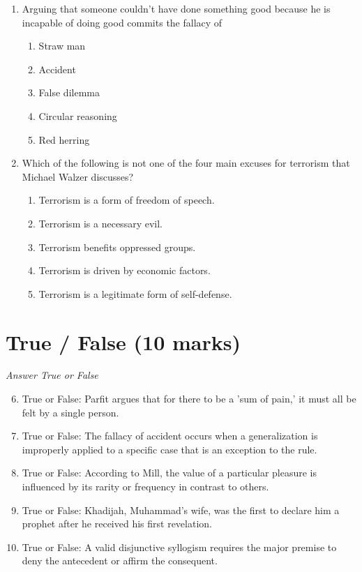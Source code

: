 \documentclass[12pt]{article}
\begin{document}
\begin{enumerate}[label=\arabic*.]
\begin{enumerate}[label=(\alph*)]
\end{enumerate}
\item Arguing that someone couldn't have done something good because he is incapable of doing
good commits the fallacy of
\begin{enumerate}[label=(\alph*)]
    \item Straw man
    \item Accident
    \item False dilemma
    \item Circular reasoning
    \item Red herring
\end{enumerate}
\item Which of the following is not one of the four main excuses for terrorism that Michael
Walzer discusses?
\begin{enumerate}[label=(\alph*)]
    \item Terrorism is a form of freedom of speech.
    \item Terrorism is a necessary evil.
    \item Terrorism benefits oppressed groups.
    \item Terrorism is driven by economic factors.
    \item Terrorism is a legitimate form of self-defense.
\end{enumerate}
\end{enumerate}

\section*{True / False (10 marks)}
\textit{Answer True or False}
\begin{enumerate}[label=\arabic*.]
\setcounter{enumi}{5}
\item True or False: Parfit argues that for there to be a 'sum of pain,' it must all be felt by a single person.
\item True or False: The fallacy of accident occurs when a generalization is improperly applied to a specific case that is an exception to the rule.
\item True or False: According to Mill, the value of a particular pleasure is influenced by its rarity or frequency in contrast to others.
\item True or False: Khadijah, Muhammad's wife, was the first to declare him a prophet after he received his first revelation.
\item True or False: A valid disjunctive syllogism requires the major premise to deny the antecedent or affirm the consequent.
\end{enumerate}
\end{document}
